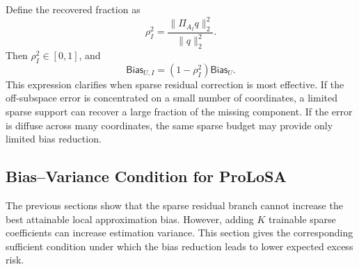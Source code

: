 Define the recovered fraction as
\begin{equation}
\rho_I^2
=
\frac{\|\Pi_{A_I}q\|_2^2}{\|q\|_2^2}.
\label{eq:app_recovered_fraction}
\end{equation}
Then $\rho_I^2\in[0,1]$, and
\begin{equation}
\mathsf{Bias}_{U,I}
=
(1-\rho_I^2)
\mathsf{Bias}_{U} .
\label{eq:app_recovered_bias_fraction}
\end{equation}
This expression clarifies when sparse residual correction is most effective.
If the off-subspace error is concentrated on a small number of coordinates, a limited sparse support can recover a large fraction of the missing component.
If the error is diffuse across many coordinates, the same sparse budget may provide only limited bias reduction.
\subsection{Bias--Variance Condition for ProLoSA}
\label{app:prolosa_bias_variance_condition}

The previous sections show that the sparse residual branch cannot increase the best attainable local approximation bias.
However, adding $K$ trainable sparse coefficients can increase estimation variance.
This section gives the corresponding sufficient condition under which the bias reduction leads to lower expected excess risk.


